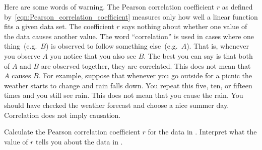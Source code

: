 \documentclass[a4paper,oneside,12pt]{article}
\begin{document}
Here are some words of warning.  The Pearson correlation coefficient
$r$ as defined by~\eqref{eqn:Pearson_correlation_coefficient} measures
only how well a linear function fits a given data set.  The
coefficient $r$ says nothing about whether one value of the data
causes another value.  The word ``correlation'' is used in cases where
one thing~(e.g.~$B$) is observed to follow something else~(e.g.~$A$).
That is, whenever you observe $A$ you notice that you also see $B$.
The best you can say is that both of $A$ and $B$ are observed
together, they are correlated.  This does not mean that $A$ causes
$B$.  For example, suppose that whenever you go outside for a picnic
the weather starts to change and rain falls down.  You repeat this
five, ten, or fifteen times and you still see rain.  This does not
mean that you cause the rain.  You should have checked the weather
forecast and choose a nice summer day.  Correlation does not imply
causation.

\begin{table}[!htbp]
\centering

\caption{%
  Detailed calculation of the Pearson correlation coefficient for the
  data in .  All numbers have been rounded to
  at most two decimal places in order to fit the table.  However, you
  should avoid rounding intermediate results.  Only the final numbers
  should be rounded.
}
\label{tab:height_weight_Pearson_r}
\end{table}

\begin{example}
Calculate the Pearson correlation coefficient $r$ for the data in
.  Interpret what the value of $r$ tells you
about the data in .
\end{example}
\end{document}
